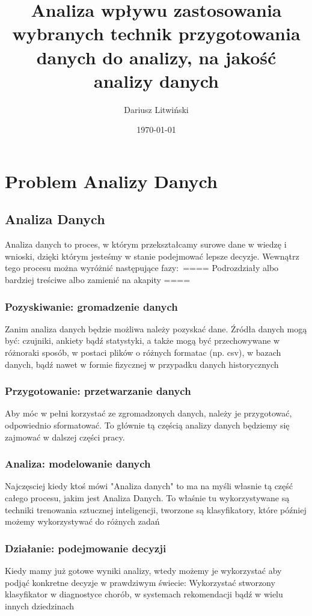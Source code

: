 \documentclass{book}
\title{Analiza wpływu zastosowania wybranych technik przygotowania danych do analizy, na jakość analizy danych}
\author{Dariusz Litwiński}
\date{\today}
\begin{document}
\maketitle
\section{Problem Analizy Danych}

\subsection{Analiza Danych}
Analiza danych to proces, 
w którym przekształcamy surowe dane w wiedzę i 
wnioski, dzięki którym jesteśmy w stanie podejmować lepsze decyzje. 
Wewnątrz tego procesu można wyróżnić następujące fazy:\
==== Podrozdziały albo bardziej treściwe albo zamienić na akapity ====
\subsubsection{Pozyskiwanie: gromadzenie danych}
Zanim analiza danych będzie możliwa należy pozyskać dane.
Źródła danych mogą być: czujniki, ankiety bądź statystyki, 
a także mogą być przechowywane w różnoraki sposób, w postaci 
plików o różnych formatac (np. csv), w bazach danych, 
bądź nawet w formie fizycznej w przypadku danych historycznych
\subsubsection{Przygotowanie: przetwarzanie danych}
Aby móc w pełni korzystać ze zgromadzonych danych, 
należy je przygotować, odpowiednio sformatować. 
To głównie tą częścią analizy danych będziemy się 
zajmować w dalszej części pracy. 
\subsubsection{Analiza: modelowanie danych}
Najczęsciej kiedy ktoś mówi "Analiza danych" to ma 
na myśli własnie tą część całego procesu, jakim jest Analiza Danych.
To właśnie tu wykorzystywane są techniki trenowania sztucznej 
inteligencji, tworzone są klasyfikatory, 
które później możemy wykorzystywać do różnych zadań
\subsubsection{Działanie: podejmowanie decyzji}
Kiedy mamy już gotowe wyniki analizy, 
wtedy możemy je wykorzystać aby podjąć 
konkretne decyzje w prawdziwym świecie: Wykorzystać stworzony 
klasyfikator w diagnostyce chorób, w systemach rekomendacji 
bądź w wielu innych dziedzinach
\end{document}
